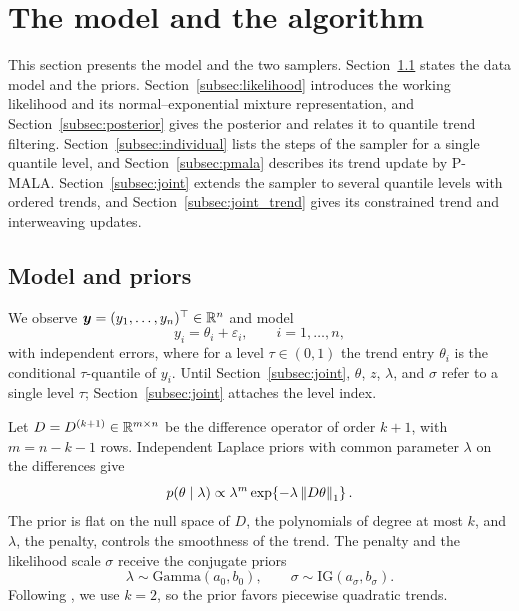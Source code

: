 \section{The model and the algorithm}
\label{sec:methodology}

This section presents the model and the two samplers. Section~\ref{subsec:model} states the data model and the priors. Section~\ref{subsec:likelihood} introduces the working likelihood and its normal--exponential mixture representation, and Section~\ref{subsec:posterior} gives the posterior and relates it to quantile trend filtering. Section~\ref{subsec:individual} lists the steps of the sampler for a single quantile level, and Section~\ref{subsec:pmala} describes its trend update by P-MALA. Section~\ref{subsec:joint} extends the sampler to several quantile levels with ordered trends, and Section~\ref{subsec:joint_trend} gives its constrained trend and interweaving updates.

\subsection{Model and priors}
\label{subsec:model}

We observe $\bm{y} = (y_1, \ldots, y_n)^\top \in \mathbb{R}^n$ and model
\begin{equation}
    y_i = \theta_i + \varepsilon_i, \qquad i = 1, \ldots, n,
    \label{eq:datamodel}
\end{equation}
with independent errors, where for a level $\tau \in (0,1)$ the trend entry $\theta_i$ is the conditional $\tau$-quantile of $y_i$. Until Section~\ref{subsec:joint}, $\theta$, $z$, $\lambda$, and $\sigma$ refer to a single level $\tau$; Section~\ref{subsec:joint} attaches the level index.

Let $D = D^{(k+1)} \in \mathbb{R}^{m \times n}$ be the difference operator of order $k+1$, with $m = n - k - 1$ rows. Independent Laplace priors with common parameter $\lambda$ on the differences give
\begin{equation}
    p(\theta \mid \lambda) \propto \lambda^{m} \exp\!\left\{-\lambda \left\lVert D\theta\right\rVert_1\right\}.
    \label{eq:prior_theta}
\end{equation}
The prior is flat on the null space of $D$, the polynomials of degree at most $k$, and $\lambda$, the penalty, controls the smoothness of the trend. The penalty and the likelihood scale $\sigma$ receive the conjugate priors
\begin{equation}
    \lambda \sim \mathrm{Gamma}(a_0, b_0), \qquad \sigma \sim \mathrm{IG}(a_\sigma, b_\sigma).
    \label{eq:hyperpriors}
\end{equation}
Following \citet{brantley2020baseline}, we use $k = 2$, so the prior favors piecewise quadratic trends.

